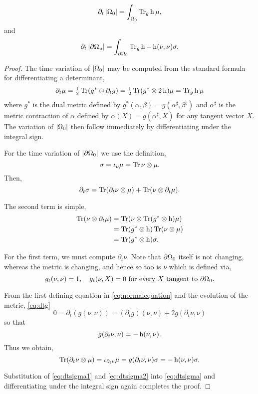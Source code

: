 \documentclass{amsart}
\begin{document}
\begin{lemma}
\label{lem:time_variation}
\[
\partial_t \left|{\Omega_0}\right| = \int_{\Omega_0} \operatorname{Tr}_g \operatorname{h} \mu,
\]
and
\[
\partial_t \left|{\partial {\Omega_u}}\right| = \int_{\partial {\Omega_0}} \operatorname{Tr}_g \operatorname{h} - \operatorname{h}(\nu, \nu) \sigma.
\]
\end{lemma}

\begin{proof}
The time variation of \(\left|{\Omega_0}\right|\) may be computed from the standard formula for differentiating a determinant,
\[
\partial_t \mu = \tfrac{1}{2}\operatorname{Tr}(g^{\ast} \otimes \partial_t g) =  \tfrac{1}{2} \operatorname{Tr} (g^{\ast} \otimes 2\operatorname{h})\mu = \operatorname{Tr}_g \operatorname{h} \mu
\]
where \(g^{\ast}\) is the dual metric defined by \(g^{\ast} (\alpha, \beta) = g(\alpha^{\sharp}, \beta^{\sharp})\) and \(\alpha^{\sharp}\) is the metric contraction of \(\alpha\) defined by \(\alpha(X) = g(\alpha^{\sharp}, X)\) for any tangent vector \(X\). The variation of \(\left|{\Omega_0}\right|\) then follow immediately by differentiating under the integral sign.

For the time variation of \(\left|{\partial {\Omega_0}}\right|\) we use the definition,
\[
\sigma = \iota_{\nu} \mu = \operatorname{Tr} \nu \otimes \mu.
\]
Then,
\begin{equation}
\label{eq:dtsigma}
\partial_t \sigma = \operatorname{Tr}(\partial_t \nu \otimes \mu) + \operatorname{Tr}(\nu \otimes \partial_t \mu).
\end{equation}

The second term is simple,
\begin{equation}
\label{eq:dtsigma2}
\begin{split}
\operatorname{Tr}(\nu \otimes \partial_t \mu) &= \operatorname{Tr}(\nu \otimes \operatorname{Tr}(g^{\ast} \otimes \operatorname{h}) \mu) \\
&= \operatorname{Tr}(g^{\ast} \otimes \operatorname{h}) \operatorname{Tr} (\nu \otimes \mu) \\
&= \operatorname{Tr}(g^{\ast} \otimes \operatorname{h}) \sigma.
\end{split}
\end{equation}

For the first term, we must compute \(\partial_t \nu\). Note that \(\partial {\Omega_0}\) itself is not changing, whereas the metric is changing, and hence so too is \(\nu\) which is defined via,
\begin{equation}
\label{eq:normalequation}
g_t(\nu, \nu) = 1, \quad g_t(\nu, X) = 0 \text{ for every \(X\) tangent to \(\partial {\Omega_0}\)}.
\end{equation}

From the first defining equation in \eqref{eq:normalequation} and the evolution of the metric, \eqref{eq:dtg}
\[
0 = \partial_t (g(\nu, \nu)) = (\partial_t g) (\nu, \nu) + 2g(\partial_t \nu, \nu)
\]
so that
\[
g(\partial_t \nu, \nu) = -\operatorname{h}(\nu, \nu).
\]
Thus we obtain,
\begin{equation}
\label{eq:dtsigma1}
\operatorname{Tr}(\partial_t \nu \otimes \mu) = \iota_{\partial_t\nu} \mu =  g(\partial_t \nu, \nu) \sigma = -\operatorname{h}(\nu, \nu) \sigma.
\end{equation}

Substitution of \eqref{eq:dtsigma1} and \eqref{eq:dtsigma2} into \eqref{eq:dtsigma} and differentiating under the integral sign again completes the proof.
\end{proof}
\end{document}

